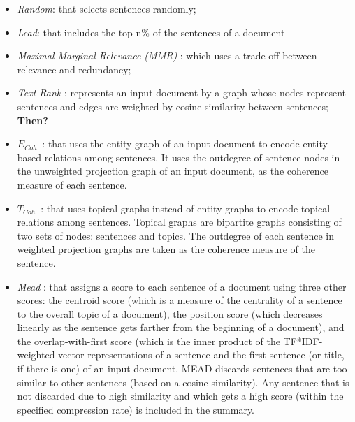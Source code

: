 \begin{itemize}
	\item \emph{Random}: that selects sentences randomly;

	\item \emph{Lead}: that includes the top n\% of the sentences of a document

	\item \emph{Maximal Marginal Relevance (MMR)} \cite{carbonell98}: which uses a \mbox{trade-off} between relevance and redundancy; 

	\item \emph{Text-Rank} \cite{mihalcea04b}: represents an input document by a graph whose nodes represent sentences and edges are weighted by cosine similarity between sentences; 
	\textbf{Then?}

	\item \emph{$E_{Coh}$}\ \cite{parveen15a}: that uses the entity graph of an input document to encode \mbox{entity-based} relations among sentences. 
	It uses the outdegree of sentence nodes in the unweighted projection graph of an input document, as the coherence measure of each sentence.

	\item \emph{$T_{Coh}$}\ \cite{parveen15b}: that uses topical graphs instead of entity graphs to encode topical relations among sentences. 
	Topical graphs are bipartite graphs consisting of two sets of nodes: sentences and topics. 
	The outdegree of each sentence in weighted projection graphs are taken as the coherence measure of the sentence.

	\item \emph{Mead} \cite{radev04b}: that assigns a score to each sentence of a document using three other scores: the centroid score (which is a measure of the centrality of a sentence to the overall topic of a document), the position score (which  decreases linearly as the sentence gets farther from the beginning of a document), and the \mbox{overlap-with-first} score (which is the inner product of the \mbox{TF*IDF-weighted} vector representations of a sentence and the first sentence (or title, if there is one) of an input document. 
	MEAD discards sentences that are too similar to other sentences (based on a cosine similarity). 
	Any sentence that is not discarded due to high similarity and which gets a high score (within the specified compression rate) is included in the summary. 


\end{itemize}
